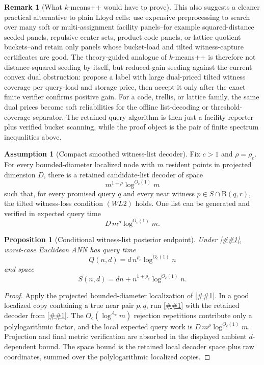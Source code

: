 \documentclass[10pt]{article}
\newcommand{\cref}[1]{\ref{##1}}
\newtheorem{proposition}[theorem]{Proposition}
\theoremstyle{definition}
\newtheorem{remark}[theorem]{Remark}
\newtheorem{assumption}[theorem]{Assumption}
\newcommand{\Ball}{\mathrm{B}}
\begin{document}
\begin{remark}[What \(k\)-means++ would have to prove]
   This also suggests a cleaner practical alternative to plain Lloyd cells:
   use expensive preprocessing to search over many soft or multi-assignment
   facility panels--for example squared-distance seeded panels, repulsive
   center sets, product-code panels, or lattice quotient buckets--and retain
   only panels whose bucket-load and tilted witness-capture certificates are
   good.  The theory-guided analogue of \(k\)-means++ is therefore not
   distance-squared seeding by itself, but reduced-gain seeding against the
   current convex dual obstruction: propose a label with large
   dual-priced tilted witness coverage per query-load and storage price, then
   accept it only after the exact finite verifier confirms positive gain.
   For a code, trellis, or lattice family, the same dual prices become soft
   reliabilities for the offline list-decoding or threshold-coverage separator.
   The retained query algorithm is then just a facility reporter plus verified
   bucket scanning, while the proof object is the pair of finite spectrum
   inequalities above.
\end{remark}

\begin{assumption}[Compact smoothed witness-list decoder]
   \label{asm:smoothed-witness-list}
   Fix \(c>1\) and \(\rho=\rho_c\).  For every bounded-diameter localized node
   with \(m\) resident points in projected dimension \(D\), there is a retained
   candidate-list decoder of space
   \[
      m^{1+\rho}\log^{O_c(1)}m
   \]
   such that, for every promised query \(q\) and every near witness
   \(p\in S\cap\Ball(q,r)\), the tilted witness-loss condition \((WL2)\) holds.
   One list can be generated and verified in expected query time
   \[
      D\,m^\rho\log^{O_c(1)}m .
   \]
\end{assumption}

\begin{proposition}[Conditional witness-list posterior endpoint]
   \label{prop:witness-list-polylog}
   Under \cref{asm:smoothed-witness-list}, worst-case Euclidean ANN has query
   time
   \[
      Q(n,d)=d\,n^{\rho_c}\log^{O_c(1)}n
   \]
   and space
   \[
      S(n,d)=dn+n^{1+\rho_c}\log^{O_c(1)}n .
   \]
\end{proposition}

\begin{proof}
   Apply the projected bounded-diameter localization of
   \cref{lem:localization}.  In a good localized copy containing a true near
   pair \(p,q\), run \cref{lem:smoothed-witness-list-compiler} with the
   retained decoder from \cref{asm:smoothed-witness-list}.  The
   \(O_c(\log^{A_c}m)\) rejection repetitions contribute only a polylogarithmic
   factor, and the local expected query work is
   \(D\,m^\rho\log^{O_c(1)}m\).  Projection and final metric verification are
   absorbed in the displayed ambient \(d\)-dependent bound.  The space bound is
   the retained local decoder space plus raw coordinates, summed over the
   polylogarithmic localized copies.
\end{proof}
\end{document}
